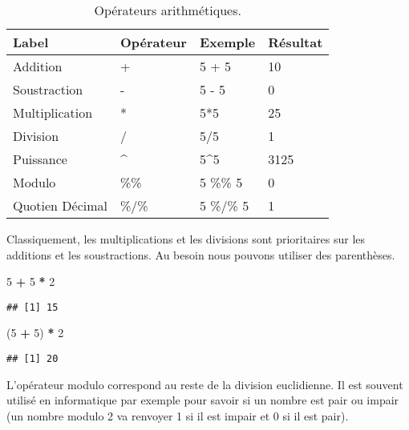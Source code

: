 \documentclass[]{book}
\newenvironment{Shaded}{\begin{snugshade}}{\end{snugshade}}
\newcommand{\DecValTok}[1]{\textcolor[rgb]{0.00,0.00,0.81}{#1}}
\newcommand{\StringTok}[1]{\textcolor[rgb]{0.31,0.60,0.02}{#1}}
\newcommand{\OperatorTok}[1]{\textcolor[rgb]{0.81,0.36,0.00}{\textbf{#1}}}
\newcommand{\NormalTok}[1]{#1}
\theoremstyle{definition}
\theoremstyle{definition}
\theoremstyle{definition}
\theoremstyle{remark}
\begin{document}
\begin{table}

\caption{\label{tab:tabOpAri}Opérateurs arithmétiques.\label{tab:tabOpAri}}
\centering
\begin{tabular}[t]{l|l|l|l}
\hline
Label & Opérateur & Exemple & Résultat\\
\hline
Addition & + & 5 + 5 & 10\\
\hline
Soustraction & - & 5 - 5 & 0\\
\hline
Multiplication & * & 5*5 & 25\\
\hline
Division & / & 5/5 & 1\\
\hline
Puissance & \textasciicircum{} & 5\textasciicircum{}5 & 3125\\
\hline
Modulo & \%\% & 5 \%\% 5 & 0\\
\hline
Quotien Décimal & \%/\% & 5 \%/\% 5 & 1\\
\hline
\end{tabular}
\end{table}

Classiquement, les multiplications et les divisions sont prioritaires
sur les additions et les soustractions. Au besoin nous pouvons utiliser
des parenthèses.

\begin{Shaded}
\begin{Highlighting}[]
\DecValTok{5} \OperatorTok{+}\StringTok{ }\DecValTok{5} \OperatorTok{*}\StringTok{ }\DecValTok{2}
\end{Highlighting}
\end{Shaded}

\begin{verbatim}
## [1] 15
\end{verbatim}

\begin{Shaded}
\begin{Highlighting}[]
\NormalTok{(}\DecValTok{5} \OperatorTok{+}\StringTok{ }\DecValTok{5}\NormalTok{) }\OperatorTok{*}\StringTok{ }\DecValTok{2}
\end{Highlighting}
\end{Shaded}

\begin{verbatim}
## [1] 20
\end{verbatim}

L'opérateur modulo correspond au reste de la division euclidienne. Il
est souvent utilisé en informatique par exemple pour savoir si un nombre
est pair ou impair (un nombre modulo 2 va renvoyer 1 si il est impair et
0 si il est pair).
\end{document}
